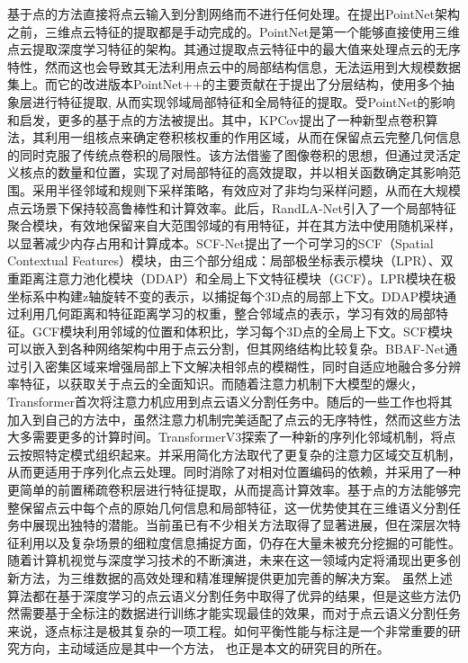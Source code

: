 基于点的方法直接将点云输入到分割网络而不进行任何处理。在提出PointNet架构之前，三维点云特征的提取都是手动完成的。PointNet是第一个能够直接使用三维点云提取深度学习特征的架构。其通过提取点云特征中的最大值来处理点云的无序特性，然而这也会导致其无法利用点云中的局部结构信息，无法运用到大规模数据集上。而它的改进版本PointNet++的主要贡献在于提出了分层结构，使用多个抽象层进行特征提取, 从而实现邻域局部特征和全局特征的提取。受PointNet的影响和启发，更多的基于点的方法被提出。其中，KPCov提出了一种新型点卷积算法，其利用一组核点来确定卷积核权重的作用区域，从而在保留点云完整几何信息的同时克服了传统点卷积的局限性。该方法借鉴了图像卷积的思想，但通过灵活定义核点的数量和位置，实现了对局部特征的高效提取，并以相关函数确定其影响范围。采用半径邻域和规则下采样策略，有效应对了非均匀采样问题，从而在大规模点云场景下保持较高鲁棒性和计算效率。此后，RandLA-Net引入了一个局部特征聚合模块，有效地保留来自大范围邻域的有用特征，并在其方法中使用随机采样，以显著减少内存占用和计算成本。SCF-Net提出了一个可学习的SCF（Spatial Contextual Features）模块，由三个部分组成：局部极坐标表示模块（LPR）、双重距离注意力池化模块（DDAP）和全局上下文特征模块（GCF）。LPR模块在极坐标系中构建z轴旋转不变的表示，以捕捉每个3D点的局部上下文。DDAP模块通过利用几何距离和特征距离学习的权重，整合邻域点的表示，学习有效的局部特征。GCF模块利用邻域的位置和体积比，学习每个3D点的全局上下文。SCF模块可以嵌入到各种网络架构中用于点云分割，但其网络结构比较复杂。BBAF-Net通过引入密集区域来增强局部上下文解决相邻点的模糊性，同时自适应地融合多分辨率特征，以获取关于点云的全面知识。而随着注意力机制下大模型的爆火，Transformer首次将注意力机应用到点云语义分割任务中。随后的一些工作也将其加入到自己的方法中，虽然注意力机制完美适配了点云的无序特性，然而这些方法大多需要更多的计算时间。TransformerV3探索了一种新的序列化邻域机制，将点云按照特定模式组织起来。并采用简化方法取代了更复杂的注意力区域交互机制，从而更适用于序列化点云处理。同时消除了对相对位置编码的依赖，并采用了一种更简单的前置稀疏卷积层进行特征提取，从而提高计算效率。基于点的方法能够完整保留点云中每个点的原始几何信息和局部特征，这一优势使其在三维语义分割任务中展现出独特的潜能。当前虽已有不少相关方法取得了显著进展，但在深层次特征利用以及复杂场景的细粒度信息捕捉方面，仍存在大量未被充分挖掘的可能性。随着计算机视觉与深度学习技术的不断演进，未来在这一领域内定将涌现出更多创新方法，为三维数据的高效处理和精准理解提供更加完善的解决方案。
虽然上述算法都在基于深度学习的点云语义分割任务中取得了优异的结果，但是这些方法仍然需要基于全标注的数据进行训练才能实现最佳的效果，而对于点云语义分割任务来说，逐点标注是极其复杂的一项工程。如何平衡性能与标注是一个非常重要的研究方向，主动域适应是其中一个方法， 也正是本文的研究目的所在。

